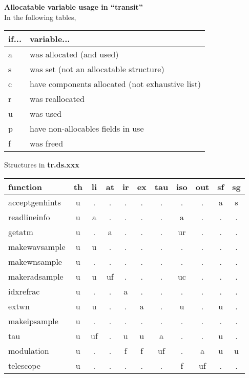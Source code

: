 \documentclass{article}
\begin{document}
\begin{center}
{\large {\bf Allocatable variable usage in ``transit''}}\\
\vfill
In the following tables, \\
\begin{tabular}{ll}
if... & variable...\\
\hline
a & was allocated (and used) \\
s & was set (not an allocatable structure)\\
c & have components allocated (not exhaustive list) \\
r & was reallocated \\
u & was used \\
p & have non-allocables fields in use \\
f & was freed \\
\end{tabular}
\end{center}

\vfill

\begin{center}
{\large Structures in {\bf tr.ds.xxx}}\\[.5cm]
\begin{tabular}{l|cccccccccc}
function
  & th & li & at & ir & ex & tau & iso & out & sf & sg \\
\hline
acceptgenhints
  & u  & .  & .  & .  & .  & .   & .   & .   & a  & s  \\
readlineinfo
  & u  & a  & .  & .  & .  & .   & a   & .   & .  & .  \\
getatm
  & u  & .  & a  & .  & .  & .   & ur  & .   & .  & .  \\
makewavsample
  & u  & u  & .  & .  & .  & .   & .   & .   & .  & .  \\
makewnsample
  & u  & .  & .  & .  & .  & .   & .   & .   & .  & .  \\
makeradsample
  & u  & u  & uf  & .  & .  & .   & uc  & .   & .  & .  \\
idxrefrac
  & u  & .  & .  & a  & .  & .   & .   & .   & .  & .  \\
extwn
  & u  & u  & .  & .  & a  & .   & u   & .   & u  & .  \\
makeipsample
  & u  & .  & .  & .  & .  & .   & .   & .   & .  & .  \\
tau
  & u  & uf & .  & u  & u  & a   & .   & .   & u  & .  \\
modulation
  & u  & .  & .  & f  & f  & uf  & .   & a   & u  & u  \\
telescope
  & u  & .  & .  & .  & .  & .   & f   & uf  & .  & .  \\
\hline
\end{tabular}
\end{center}
\end{document}
